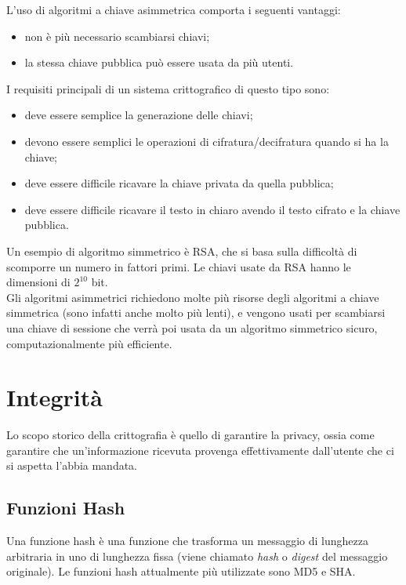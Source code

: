 \documentclass[a4paper, 11pt]{article}
\begin{document}
\begin{multicols}{2}
		L'uso di algoritmi a chiave asimmetrica comporta i seguenti vantaggi:
		\begin{itemize}
			\item non è più necessario scambiarsi chiavi;
			\item la stessa chiave pubblica può essere usata da più utenti.
		\end{itemize}
	
		I requisiti principali di un sistema crittografico di questo tipo sono:
		\begin{itemize}
			\item deve essere semplice la generazione delle chiavi;
			\item devono essere semplici le operazioni di cifratura/decifratura quando si ha la chiave;
			\item deve essere difficile ricavare la chiave privata da quella pubblica;
			\item deve essere difficile ricavare il testo in chiaro avendo il testo cifrato e la chiave pubblica.
		\end{itemize}
		Un esempio di algoritmo simmetrico è RSA, che si basa sulla difficoltà di scomporre un numero in fattori primi. Le chiavi usate da RSA hanno le dimensioni di $2^{10}$ bit. \\
		
		Gli algoritmi asimmetrici richiedono molte più risorse degli algoritmi a chiave simmetrica (sono infatti anche molto più lenti), e vengono usati per scambiarsi una chiave di sessione che verrà poi usata da un algoritmo simmetrico sicuro, computazionalmente più efficiente.
	
	
		
		
		
		
		
		\section{Integrità}
		Lo scopo storico della crittografia è quello di garantire la privacy, ossia come garantire che un'informazione ricevuta provenga effettivamente dall'utente che ci si aspetta l'abbia mandata.
		
		\subsection{Funzioni Hash}
		Una funzione hash è una funzione che trasforma un messaggio di lunghezza arbitraria in uno di lunghezza fissa (viene chiamato \textit{hash} o \textit{digest} del messaggio originale). Le funzioni hash attualmente più utilizzate sono MD5 e SHA.
		

\end{multicols}
\end{document}
